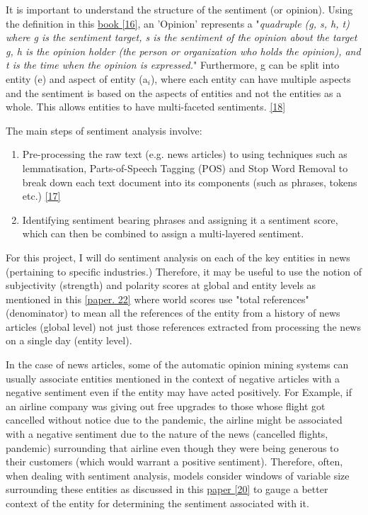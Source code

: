 It is important to understand the structure of the sentiment (or opinion). Using the definition in this \hyperlink{16}{book [16]}, an 'Opinion' represents a "\textit{quadruple (g, s, h, t) where g is the sentiment target, s is the sentiment of the opinion about the target g,
h is the opinion holder (the person or organization who holds the opinion), and t is the time when the opinion is expressed.}" Furthermore, g can be split into entity (e) and aspect of entity (a$_{i}$), where each entity can have multiple aspects and the sentiment is based on the aspects of entities and not the entities as a whole. This allows entities to have multi-faceted sentiments. \hyperlink{18}{[18]} 

The main steps of sentiment analysis involve: 
\begin{enumerate}
\item Pre-processing the raw text (e.g. news articles) to using techniques such as lemmatisation, Parts-of-Speech Tagging (POS) and Stop Word
Removal to break down each text document into its components (such as phrases, tokens etc.) \hyperlink{17}{[17]}
\item Identifying sentiment bearing phrases and assigning it a sentiment score, which can then be combined to assign a multi-layered sentiment.
\end{enumerate}

For this project, I will do sentiment analysis on each of the key entities in news (pertaining to specific industries.) Therefore, it may be useful to use the notion of subjectivity (strength) and polarity scores at global and entity levels as mentioned in this \hyperlink{22}{[paper. 22]} where world scores use "total references" (denominator) to mean all the references of the entity from a history of news articles (global level) not just those references extracted from processing the news on a single day (entity level).  

In the case of news articles, some of the automatic opinion mining systems can usually associate entities mentioned in the context of negative articles with a negative sentiment even if the entity may have acted positively. For Example, if an airline company was giving out free upgrades to those whose flight got cancelled without notice due to the pandemic, the airline might be associated with a negative sentiment due to the nature of the news (cancelled flights, pandemic) surrounding that airline even though they were being generous to their customers (which would warrant a positive sentiment). Therefore, often, when dealing with sentiment analysis, models consider windows of variable size surrounding these entities as discussed in this \hyperlink{20}{paper [20]} to gauge a better context of the entity for determining the sentiment associated with it.


